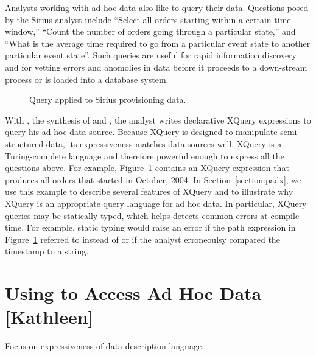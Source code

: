 \documentclass{sigplanconf}
\newcommand{\dibbler}{Sirius}
\begin{document}
Analysts working with ad hoc data also like to query their data.  
Questions posed by the \dibbler{} analyst include ``Select all
orders starting within a certain time window,'' ``Count the number of
orders going through a particular state,'' and ``What is the average
time required to go from a particular event state to another
particular event state''.  Such queries are useful for rapid
information discovery and for vetting errors and anomolies in data
before it proceeds to a down-stream process or is loaded into a 
database system. 

\begin{figure}
\begin{small}
\end{small}
\caption{Query applied to \dibbler{} provisioning data.}
\label{figure:dibbler-query}
\end{figure}

With \padx{}, the synthesis of \pads{} and \Galax{}, the analyst
writes declarative XQuery expressions to query his ad hoc data source.
Because XQuery is designed to manipulate semi-structured data, its
expressiveness matches \pads{} data sources well.  XQuery is a
Turing-complete language and therefore powerful
enough to express all the questions above.  For example,
Figure~\ref{figure:dibbler-query} contains an XQuery expression that
produces all orders that started in October, 2004.  In
Section~\ref{section:padx}, we use this example to describe several
features of XQuery and to illustrate why XQuery is an appropriate
query language for ad hoc data.  In particular, XQuery queries may be
statically typed, which helps detects common errors at compile time.
For example, static typing would raise an error if the path expression
in Figure~\ref{figure:dibbler-query} referred to  instead
of  or if the analyst erroneoulsy compared the timestamp
 to a string.

\section{Using \pads{} to Access Ad Hoc Data [Kathleen]}
\label{section:pads}

Focus on expressiveness of data description language.
\end{document}
